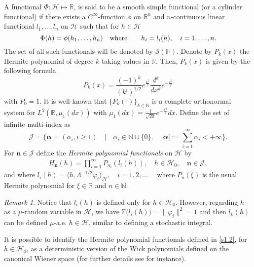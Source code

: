 \documentclass[]{interact}
\newcommand{\IR}{{\mathbb R}}
\newcommand{\R}{{\mathbb R}}
\newcommand{\IN}{{\mathbb N}}
\newcommand{\E}{\mathbb{E}}
\theoremstyle{plain}%
\theoremstyle{definition}
\theoremstyle{remark}
\newtheorem{remark}{Remark}
\begin{document}
        A functional $\Phi:\mathcal{H}\mapsto \IR$, is said to be a smooth 
    simple functional (or a cylinder functional) if there exists a
    $C^\infty$-function $\phi$ on $\IR^n$ and $n$-continuous linear 
    functional $l_1,\ldots,l_n$ on $\mathcal{H}$ such that for
    $h\in\mathcal{H}$
    \begin{equation}
        \Phi(h)=\phi(h_1,\ldots,h_n)\quad
        \mbox{\rm where}\qquad h_i=l_i(h),\quad i=1,\ldots,n.\label{S1.2}
    \end{equation}
    The set of all such functionals will be denoted by 
    $\mathcal{S}(\mathbb{H})$.
%
    Denote by $P_k(x)$ the Hermite polynomial of degree $k$ taking values in
    $\IR$. Then, $P_k(x)$ is given by the following formula
    \[
         P_k(x)=\frac{(-1)^k}{(k!)^{1/2}} e^{\tfrac{x^2}{2}}
         \frac{d^k}{dx^k}e^{-\tfrac{x^2}{2}}
    \]
    with $P_0=1$. It is well-known that $\{P_k(\cdot)\}_{k\in\IN}$ is a complete
    orthonormal system for $L^2(\IR,\mu_1(dx))$ with
    $
        \mu_1(dx) =
            \tfrac{1}{\sqrt{2\pi}}
            e^{-\tfrac{x^2}{2}} dx
    $.
    Define the set of infinite multi-index as
    \[
        \mathcal{J} =
            \Big\{ \bm{\alpha} 
                =(\alpha_i,i\ge 1)\quad \big|\quad\alpha_i\in
                \IN\cup\{0\},\quad |\bm{\alpha}|
                :=\sum_{i=1}^\infty
                \alpha_i<+\infty  
            \Big\}.
    \]
    For $\bm{n} \in \mathcal{J}$ 
    define the {\it Hermite polynomial functionals}
    on $\mathcal{H}$ by
    \begin{align}
        \label{s1.2}
        H_{\bm{n}}(h) = \prod_{i=1}^\infty P_{n_i}(l_i(h)),\quad
        h \in \mathcal{H}_0, \quad \bm{n} \in \mathcal{J},
    \end{align}
    and where
    $
        l_i(h) = 
        \langle 
            h,  \Lambda^{-1/2} \varphi_i 
        \rangle_\mathcal{H}, \quad
        i=1,2,\ldots \quad
    $
    where $P_n(\xi)$ is the usual Hermite polynomial for  $\xi\in\R$ and
    $n\in\IN$.
%
    \begin{remark}
        Notice that $l_i(h)$ is defined only for $h \in\mathcal{H}_0$. However,
        regarding $h$ as a $\mu$-random variable in
        $\mathcal{H}$, we have $\E\big(l_i (h)\big) = \|\varphi_i \|^2  = 1$ and
        then $l_k (h)$ can be defined $\mu$-a.e. $h \in\mathcal{H}$,
        similar to defining a stochastic integral.
    
        It is possible to identify the Hermite polynomial functionals
        defined in \eqref{s1.2}, for $h \in\mathcal{H}_0$, as a deterministic
        version of the Wick polynomials defined on the canonical Wiener 
        space (for further details see \cite{im} for instance).
    \end{remark}
\end{document}
